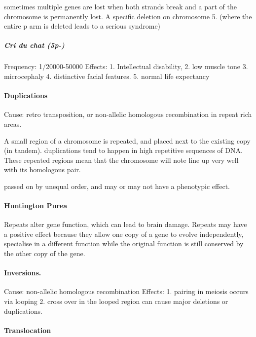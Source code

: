 \documentclass[]{article}
\let\oldparagraph\paragraph
\renewcommand{\paragraph}[1]{\oldparagraph{#1}\mbox{}}
\let\oldsubparagraph\subparagraph
\renewcommand{\subparagraph}[1]{\oldsubparagraph{#1}\mbox{}}
\begin{document}
sometimes multiple genes are lost when both strands break and a part of
the chromosome is permanently lost. A specific deletion on chromosome 5.
(where the entire p arm is deleted leads to a serious syndrome)

\hypertarget{cri-du-chat-5p-}{%
\subparagraph{Cri du chat (5p-)}\label{cri-du-chat-5p-}}

Frequency: 1/20000-50000 Effects: 1. Intellectual disability, 2. low
muscle tone 3. microcephaly 4. distinctive facial features. 5. normal
life expectancy

\hypertarget{duplications}{%
\paragraph{Duplications}\label{duplications}}

Cause: retro transposition, or non-allelic homologous recombination in
repeat rich areas.

A small region of a chromosome is repeated, and placed next to the
existing copy (in tandem). duplications tend to happen in high
repetitive sequences of DNA. These repeated regions mean that the
chromosome will note line up very well with its homologous pair.

passed on by unequal order, and may or may not have a phenotypic effect.

\hypertarget{huntington-purea}{%
\paragraph{Huntington Purea}\label{huntington-purea}}

Repeats alter gene function, which can lead to brain damage. Repeats may
have a positive effect because they allow one copy of a gene to evolve
independently, specialise in a different function while the original
function is still conserved by the other copy of the gene.

\hypertarget{inversions.}{%
\paragraph{Inversions.}\label{inversions.}}

Cause: non-allelic homologous recombination Effects: 1. pairing in
meiosis occurs via looping 2. cross over in the looped region can cause
major deletions or duplications.

\hypertarget{translocation}{%
\paragraph{Translocation}\label{translocation}}
\end{document}
